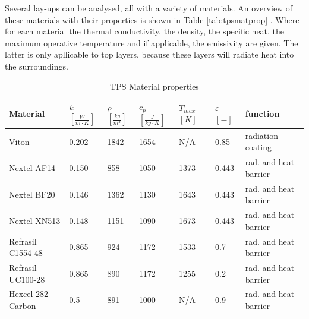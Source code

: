 Several lay-ups can be analysed, all with a variety of materials. An overview of these materials with their properties is shown in Table  \ref{tab:tpsmatprop} \cite{Corso2009,DuPont2011,Smith2011} . Where for each material the thermal conductivity, the density, the specific heat, the maximum operative temperature and if applicable, the emissivity are given. The latter is only apllicable to top layers, because these layers will radiate heat into the surroundings.

\begin{table}[H]
	\caption {TPS Material properties}
	\centering
	\begin{tabular}{|l|l|l|l|l|l|l|}
		\hline
		\textbf{Material}         & \textbf{ $ k $ $ \left[ \frac{W}{m \cdot K} \right] $} & \textbf{ $ \rho $ $ \left[ \frac{kg}{m^3} \right] $} & \textbf{  $ c_{p} $ $ \left[ \frac{J}{kg \cdot K} \right] $ }& \textbf{ $ T_{max} $ $ [ K ] $} &\textbf{ $ \varepsilon $ $ [ - ] $} & \textbf{function} \\[1.6ex]   \hline \hline
		Viton       & 0.202 & 1842 & 1654 & N/A	 & 0.85 & radiation coating
		\\ \hline
		Nextel AF14       & 0.150                                                 & 858                                        & 1050                                            & 1373	 & 0.443    & rad. and heat barrier                                 \\ \hline
		Nextel BF20       & 0.146 
		& 1362                                        & 1130 
		& 1643	 & 0.443  & rad. and heat barrier                                  
		\\ \hline
		Nextel XN513      & 0.148                                                 & 1151                                       & 1090                                            & 1673	 & 0.443           & rad. and heat barrier                               \\ \hline
		Refrasil C1554-48 & 0.865                                                 & 924                                        & 1172                                            & 1533	 & 0.7     & rad. and heat barrier                                       \\ \hline
		Refrasil UC100-28 & 0.865                                                 & 890                                        & 1172                                            & 1255  & 0.2       & rad. and heat barrier                                    \\ \hline
		Hexcel 282 Carbon & 0.5                                                   & 891                                        & 1000                                            & N/A 	 & 0.9      & rad. and heat barrier                                     \\ \hline

\end{tabular}
\end{table}
